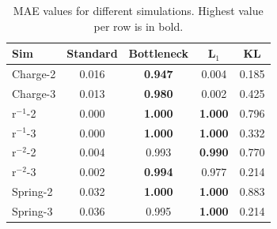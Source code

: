 \documentclass[11pt]{article}
\begin{document}
    \begin{table}[H]
        \centering
        \begin{tabular}{lcccc}
        \hline
        Sim & Standard & Bottleneck & L$_1$ & KL \\
        \hline
        Charge-2 & 0.016 & \textbf{0.947} & 0.004 & 0.185 \\
        Charge-3 & 0.013 & \textbf{0.980} & 0.002 & 0.425 \\
        r$^{-1}$-2 & 0.000 & \textbf{1.000} & \textbf{1.000} & 0.796 \\
        r$^{-1}$-3 & 0.000 & \textbf{1.000} & \textbf{1.000} & 0.332 \\
        r$^{-2}$-2 & 0.004 & 0.993 & \textbf{0.990} & 0.770 \\
        r$^{-2}$-3 & 0.002 & \textbf{0.994} & 0.977 & 0.214 \\
        Spring-2 & 0.032 & \textbf{1.000} & \textbf{1.000} & 0.883 \\
        Spring-3 & 0.036 & 0.995 & \textbf{1.000} & 0.214 \\
        \hline
        \end{tabular}
        \caption{MAE values for different simulations. Highest value per row is in bold.}
        \label{tab:R2_original}
    \end{table}
\end{document}
